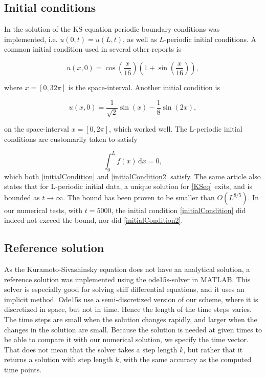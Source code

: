 \subsection{Initial conditions}
In the solution of the KS-equation periodic boundary conditions was implemented, i.e. $u(0,t) = u(L,t)$, as well as $L$-periodic initial conditions. A common initial condition used in several other reports is

\begin{equation}
\label{initialCondition}
u(x,0) = \cos(\frac{x}{16})(1 + \sin(\frac{x}{16})),
\end{equation}

where $x = [0, 32\pi]$ is the space-interval. Another initial condition is

\begin{equation}
\label{initialCondition2}
u(x,0) = \frac{1}{\sqrt{2}} \sin(x) - \frac{1}{8}\sin(2x),
\end{equation}

on the space-interval $x = [0, 2\pi]$, which worked well. The L-periodic initial conditions are customarily taken \cite{periodicInitial} to satisfy

\begin{equation}
\int_0^L\! f(x)\,\textrm{d}x = 0,
\end{equation} 
which both \eqref{initialCondition} and \eqref{initialCondition2} satisfy. The same article also states that for L-periodic initial data, a unique solution for \eqref{KSeq} exits, and is bounded as $t\rightarrow\infty$. The bound has been proven to be smaller than $O(L^{8/5})$. In our numerical tests, with $t=5000$, the initial condition \eqref{initialCondition} did indeed not exceed the bound, nor did \eqref{initialCondition2}.

\subsection{Reference solution}
As the Kuramoto-Sivashinsky equation does not have an analytical solution, a reference solution was implemented using the ode15s-solver in MATLAB. This solver is especially good for solving stiff differential equations, and it uses an implicit method. Ode15s use a semi-discretized version of our scheme, where it is discretized in space, but not in time. Hence the length of the time steps varies. The time steps are small when the solution changes rapidly, and larger when the changes in the solution are small. Because the solution is needed at given times to be able to compare it with our numerical solution, we specify the time vector. That does not mean that the solver takes a step length $k$, but rather that it returns a solution with step length $k$, with the same accuracy as the computed time points. \cite{ode15s}


